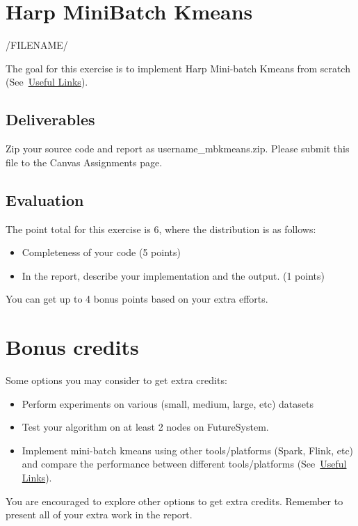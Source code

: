 \section{Harp Mini\-Batch Kmeans}

/FILENAME/


The goal for this exercise is to implement Harp Mini-batch Kmeans
from scratch (See~\hyperlink{link_exercise8}{Useful Links}). 

\subsection{Deliverables}
Zip your source code and report as username\_mbkmeans.zip. Please submit this
file to the Canvas Assignments page.

\subsection{Evaluation}

The point total for this exercise is 6, where the distribution is as
follows:

\begin{itemize}
\item Completeness of your code (5 points)
\item In the report, describe your implementation and the output. (1 points)
\end{itemize}

You can get up to 4 bonus points based on your extra efforts.

\section{Bonus credits}

Some options you may consider to get extra credits: 

\begin{itemize}
\item Perform experiments on various (small, medium, large, etc)
  datasets
\item Test your algorithm on at least 2 nodes on FutureSystem.
\item Implement mini-batch kmeans using other tools/platforms (Spark,
  Flink, etc) and compare the performance between different
  tools/platforms (See~\hyperlink{link_exercise8}{Useful Links}).
\end{itemize}

You are encouraged to explore other options to get extra
credits. Remember to present all of your extra work in the report.
 
